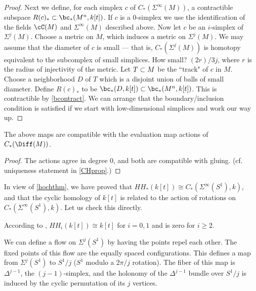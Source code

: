\begin{proof}
Next we define, for each simplex $c$ of $C_*(\Sigma^\infty(M))$, a contractible subspace
$R(c)_* \sub \bc_*(M^n, k[t])$.
If $c$ is a 0-simplex we use the identification of the fields $\cC(M)$ and 
$\Sigma^\infty(M)$ described above.
Now let $c$ be an $i$-simplex of $\Sigma^j(M)$.
Choose a metric on $M$, which induces a metric on $\Sigma^j(M)$.
We may assume that the diameter of $c$ is small --- that is, $C_*(\Sigma^j(M))$
is homotopy equivalent to the subcomplex of small simplices.
How small?  $(2r)/3j$, where $r$ is the radius of injectivity of the metric.
Let $T\subset M$ be the ``track" of $c$ in $M$.
Choose a neighborhood $D$ of $T$ which is a disjoint union of balls of small diameter.
Define $R(c)_*$ to be $\bc_*(D, k[t]) \sub \bc_*(M^n, k[t])$.
This is contractible by \ref{bcontract}.
We can arrange that the boundary/inclusion condition is satisfied if we start with
low-dimensional simplices and work our way up.

\end{proof}


\begin{prop} \label{ktchprop}
The above maps are compatible with the evaluation map actions of $C_*(\Diff(M))$.
\end{prop}

\begin{proof}
The actions agree in degree 0, and both are compatible with gluing.
(cf. uniqueness statement in \ref{CHprop}.)
\end{proof}

\medskip

In view of \ref{hochthm}, we have proved that $HH_*(k[t]) \cong C_*(\Sigma^\infty(S^1), k)$,
and that the cyclic homology of $k[t]$ is related to the action of rotations
on $C_*(\Sigma^\infty(S^1), k)$.
Let us check this directly.

According to \cite[3.2.2]{MR1600246}, $HH_i(k[t]) \cong k[t]$ for $i=0,1$ and is zero for $i\ge 2$.

We can define a flow on $\Sigma^j(S^1)$ by having the points repel each other.
The fixed points of this flow are the equally spaced configurations.
This defines a map from $\Sigma^j(S^1)$ to $S^1/j$ ($S^1$ modulo a $2\pi/j$ rotation).
The fiber of this map is $\Delta^{j-1}$, the $(j-1)$-simplex, 
and the holonomy of the $\Delta^{j-1}$ bundle
over $S^1/j$ is induced by the cyclic permutation of its $j$ vertices.

